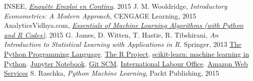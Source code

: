 \listoffigures
\newpage\null\thispagestyle{empty}\newpage  %

\begin{thebibliography}{9}
        INSEE,
        \href{https://www.insee.fr/fr/statistiques/2388681}{\emph{Enqu\^ete Emploi en Continu}}.
        2015
        J. M. Wooldridge,
        \emph{Introductory Econometrics: A Modern Approach},
        CENGAGE Learning,
        2015
        AnalyticsVidhya.com,
        \href{https://www.analyticsvidhya.com/blog/2015/08/common-machine-learning-algorithms/}
        {\emph{Essentials of Machine Learning Algorithms (with Python and R Codes)}}.
        2015
        G. James, D. Witten, T. Hastie, R. Tibshirani,
        \emph{An Introduction to Statistical Learning with Applications in R}.
        Springer,
        2013
        \href{https://www.python.org/}{The Python Programming Language}.
        \href{https://www.r-project.org/}{The R Project}.
        \href{http://scikit-learn.org/}{scikit-learn: machine learning in Python}.
        \href{https://jupyter.org/}{Jupyter Notebook}.
        \href{https://git-scm.com/}{Git SCM}.
        \href{http://www.ilo.org/}{International Labour Office}.
        \href{https://aws.amazon.com/}{Amazon Web Services}
        S. Raschka,
        \emph{Python Machine Learning},
        Packt Publishing,
        2015
\end{thebibliography}

\newpage\null\thispagestyle{empty}\newpage  %
